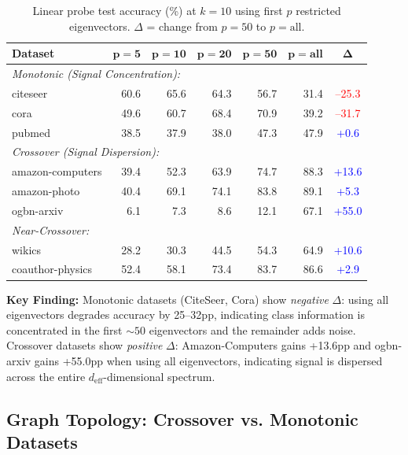 \documentclass[11pt]{article}
\begin{document}
\begin{table}[h]
\centering
\caption{Linear probe test accuracy (\%) at $k{=}10$ using first $p$ restricted eigenvectors. $\Delta$ = change from $p{=}50$ to $p{=}\text{all}$.}
\label{tab:linear_probe}
\begin{tabular}{lrrrrrc}
\toprule
\textbf{Dataset} & $\bm{p{=}5}$ & $\bm{p{=}10}$ & $\bm{p{=}20}$ & $\bm{p{=}50}$ & $\bm{p{=}\textbf{all}}$ & $\bm{\Delta}$ \\
\midrule
\multicolumn{7}{l}{\textit{Monotonic (Signal Concentration):}} \\
citeseer         & 60.6 & 65.6 & 64.3 & 56.7 & 31.4 & \textcolor{red}{--25.3} \\
cora             & 49.6 & 60.7 & 68.4 & 70.9 & 39.2 & \textcolor{red}{--31.7} \\
pubmed           & 38.5 & 37.9 & 38.0 & 47.3 & 47.9 & \textcolor{blue}{+0.6} \\
\midrule
\multicolumn{7}{l}{\textit{Crossover (Signal Dispersion):}} \\
amazon-computers & 39.4 & 52.3 & 63.9 & 74.7 & 88.3 & \textcolor{blue}{+13.6} \\
amazon-photo     & 40.4 & 69.1 & 74.1 & 83.8 & 89.1 & \textcolor{blue}{+5.3} \\
ogbn-arxiv       & 6.1  & 7.3  & 8.6  & 12.1 & 67.1 & \textcolor{blue}{+55.0} \\
\midrule
\multicolumn{7}{l}{\textit{Near-Crossover:}} \\
wikics           & 28.2 & 30.3 & 44.5 & 54.3 & 64.9 & \textcolor{blue}{+10.6} \\
coauthor-physics & 52.4 & 58.1 & 73.4 & 83.7 & 86.6 & \textcolor{blue}{+2.9} \\
\bottomrule
\end{tabular}
\end{table}

\textbf{Key Finding:} Monotonic datasets (CiteSeer, Cora) show \emph{negative} $\Delta$: using all eigenvectors degrades accuracy by 25--32pp, indicating class information is concentrated in the first ${\sim}50$ eigenvectors and the remainder adds noise. Crossover datasets show \emph{positive} $\Delta$: Amazon-Computers gains +13.6pp and ogbn-arxiv gains +55.0pp when using all eigenvectors, indicating signal is dispersed across the entire $d_{\text{eff}}$-dimensional spectrum.

\subsection{Graph Topology: Crossover vs. Monotonic Datasets}
\end{document}
